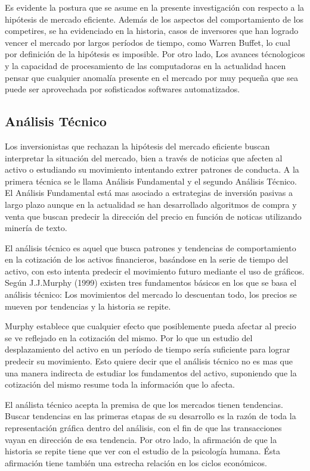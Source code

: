 \documentclass[a4paper,12pt]{Latex/Classes/PhDthesisPSnPDF}
\begin{document}
Es evidente la postura que se asume en la presente investigación con respecto a la hipótesis de mercado eficiente. Además de los aspectos del comportamiento de los competires, se ha evidenciado en la historia, casos de inversores que han logrado vencer el mercado por largos períodos de tiempo, como Warren Buffet, lo cual por definición de la hipótesis es imposible. Por otro lado, Los avances técnologicos y la capacidad de procesamiento de las computadoras en la actualidad hacen pensar que cualquier anomalía presente en el mercado por muy pequeña que sea puede ser aprovechada por sofisticados softwares automatizados.

\subsection{Análisis Técnico}

Los inversionistas que rechazan la hipótesis del mercado eficiente buscan interpretar la situación del mercado, bien a través de noticias que afecten al activo o estudiando su movimiento intentando extrer patrones de conducta. A la primera técnica se le llama Análisis Fundamental y el segundo Análisis Técnico. El Análisis Fundamental está mas asociado a estrategias de inversión pasivas a largo plazo aunque en la actualidad se han desarrollado algoritmos de compra y venta que buscan predecir la dirección del precio en función de noticas utilizando minería de texto.

El análisis técnico es aquel que busca patrones y tendencias de comportamiento en la cotización de los activos financieros, basándose en la serie de tiempo del activo, con esto intenta predecir el movimiento futuro mediante el uso de gráficos. Según J.J.Murphy (1999) existen tres fundamentos básicos en los que se basa el análisis técnico: Los movimientos del mercado lo descuentan  todo, los precios se mueven por tendencias y la historia se repite.

Murphy establece que cualquier efecto que posiblemente pueda afectar al precio se ve reflejado en la cotización del mismo. Por lo que un estudio del desplazamiento del activo en un período de tiempo sería suficiente para lograr predecir su movimiento. Esto quiere decir que el análisis técnico no es mas que una manera indirecta de estudiar los fundamentos del activo, suponiendo que la cotización del mismo resume toda la información que lo afecta. 

El análista técnico acepta la premisa de que los mercados tienen tendencias. Buscar tendencias en las primeras etapas de su desarrollo es la razón de toda la representación gráfica dentro del análisis, con el fin de que las transacciones vayan en dirección de esa tendencia. Por otro lado, la afirmación de que la historia se repite tiene que ver con el estudio de la psicología humana. Ésta afirmación tiene también una estrecha relación en los ciclos económicos. 
\end{document}
